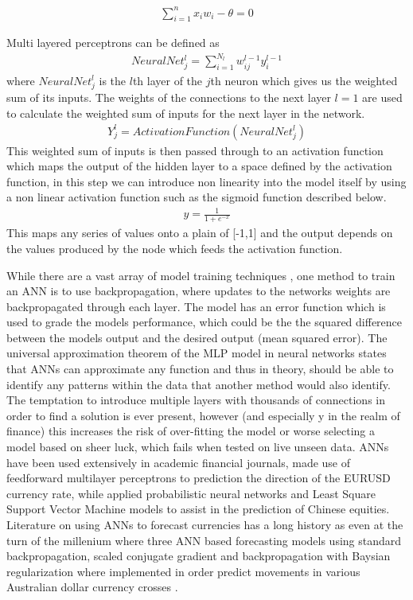\documentclass[12pt, a4paper]{article}
\begin{document}
\begin{align}
\sum^{n}_{i = 1} x_{i}w_{i} - \theta = 0  
\end{align}

Multi layered perceptrons can be defined as 
\begin{align}
NeuralNet^{l}_{j} =  \sum^{N_{l}}_{i = 1}w^{l-1}_{ij} y^{l-1}_{i}  
\end{align}
where $NeuralNet^{l}_{j}$ is the $l$th layer of the $j$th neuron which gives us the weighted sum of its inputs. The weights of the connections to the next layer $l=1$ are used to calculate the weighted sum of inputs for the next layer in the network.  \begin{align}
Y^{l}_{j} =  ActivationFunction(NeuralNet^{l}_{j})  
\end{align} 
This weighted sum of inputs is then passed through to an activation function which maps the output of the hidden layer to a space defined by the activation function, in this step we can introduce non linearity into the model itself by using a non linear activation function such as the sigmoid function described below.
\begin{align}
y =  \frac{1}{1+e^{-x} }
\end{align} 
This maps any series of values onto a plain of [-1,1] and the output depends on the values produced by the node which feeds the activation function. \par While there are a vast array of model training techniques , one method to train an ANN is to use backpropagation, where updates to the networks weights are backpropagated through each layer. The model has an error function which is used to grade the models performance, which could be the the squared difference between the models output and the desired output (mean squared error).  \newline The universal approximation theorem \cite{Kolmogorov1992} of the MLP model in neural networks states that ANNs can approximate any function and thus in theory, should be able to identify any patterns within the data that another method would also identify. \newline The temptation to introduce multiple layers with thousands of connections in order to find a solution is ever present, however (and especially y in the realm of finance) this increases the risk of over-fitting the model or worse selecting a model based on sheer luck, which fails when tested on live unseen data. 
\newline ANNs have been used extensively in academic financial journals, \cite{Czekalski2015} made use of feedforward multilayer perceptrons to prediction the direction of the EURUSD currency rate, while \cite{Wang2014} applied probabilistic neural networks and  Least Square Support Vector Machine models to assist in the prediction of Chinese equities. Literature on using ANNs to forecast currencies has a long history as even at the turn of the millenium where three ANN based forecasting models using standard backpropagation, scaled conjugate gradient and backpropagation with Baysian regularization where implemented in order predict movements in various Australian dollar currency crosses \cite{Joarder2013}.
\end{document}
